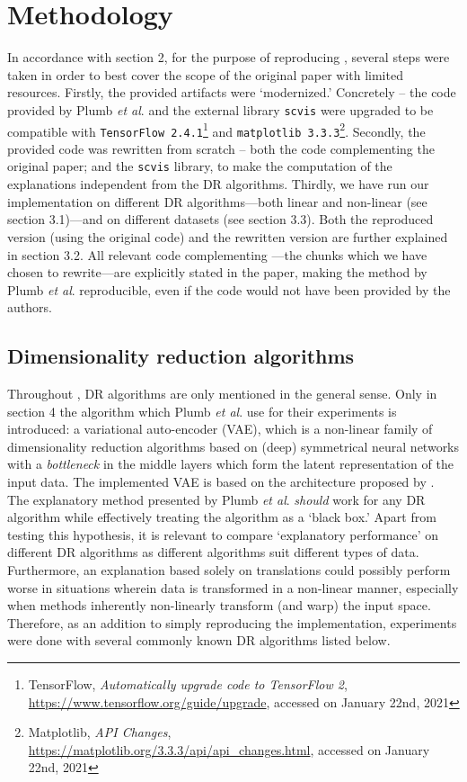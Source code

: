 \section{Methodology}
In accordance with section 2, for the purpose of reproducing \citep{plumb2020explaining}, several steps were taken in order to best cover the scope of the original paper with limited resources. Firstly, the provided artifacts were `modernized.' Concretely -- the code provided by Plumb \textit{et al}. and the external library \texttt{scvis} were upgraded to be compatible with \texttt{TensorFlow 2.4.1}\footnote{TensorFlow, \textit{Automatically upgrade code to TensorFlow 2}, \url{https://www.tensorflow.org/guide/upgrade}, accessed on January 22nd, 2021} and \texttt{matplotlib 3.3.3}\footnote{Matplotlib, \textit{API Changes}, \url{https://matplotlib.org/3.3.3/api/api_changes.html}, accessed on January 22nd, 2021}. Secondly, the provided code was rewritten from scratch -- both the code complementing the original paper; and the \texttt{scvis} library, to make the computation of the explanations independent from the DR algorithms. Thirdly, we have run our implementation on different DR algorithms---both linear and non-linear (see section 3.1)---and on different datasets (see section 3.3). Both the reproduced version (using the original code) and the rewritten version are further explained in section 3.2. All relevant code complementing \cite{plumb2020explaining}---the chunks which we have chosen to rewrite---are explicitly stated in the paper, making the method by Plumb \textit{et al}. reproducible, even if the code would not have been provided by the authors. 

\subsection{Dimensionality reduction algorithms}
Throughout \cite{plumb2020explaining}, DR algorithms are only mentioned in the general sense. Only in section 4 the algorithm which Plumb \textit{et al}. use for their experiments is introduced: a variational auto-encoder (VAE), which is a non-linear family of dimensionality reduction algorithms based on (deep) symmetrical neural networks with a \textit{bottleneck} in the middle layers which form the latent representation of the input data. The implemented VAE is based on the architecture proposed by \cite{ding2018interpretable}.\\

The explanatory method presented by Plumb \textit{et al}. \textit{should} work for any DR algorithm while effectively treating the algorithm as a `black box.' Apart from testing this hypothesis, it is relevant to compare `explanatory performance' on different DR algorithms as different algorithms suit different types of data. Furthermore, an explanation based solely on translations could possibly perform worse in situations wherein data is transformed in a non-linear manner, especially when methods inherently non-linearly transform (and warp) the input space. Therefore, as an addition to simply reproducing the implementation, experiments were done with several commonly known DR algorithms listed below.

